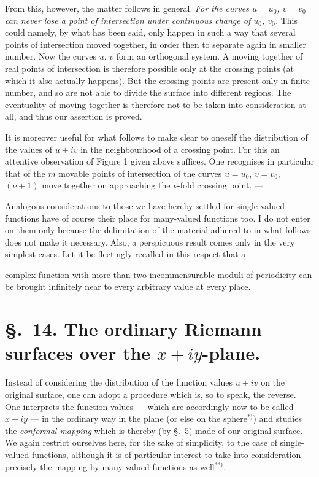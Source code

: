 \documentclass{article}
\begin{document}
From this, however, the matter follows in general. \emph{For the curves $u = u_{0}$, $v = v_{0}$ can never lose a point of intersection under continuous change of $u_{0}$, $v_{0}$.} This could namely, by what has been said, only happen in such a way that several points of intersection moved together, in order then to separate again in smaller number. Now the curves $u$, $v$ form an orthogonal system. A moving together of real points of intersection is therefore possible only at the crossing points (at which it also actually happens). But the crossing points are present only in finite number, and so are not able to divide the surface into different regions. The eventuality of moving together is therefore not to be taken into consideration at all, and thus our assertion is proved.

It is moreover useful for what follows to make clear to oneself the distribution of the values of $u + iv$ in the neighbourhood of a crossing point. For this an attentive observation of Figure 1 given above suffices. One recognises in particular that of the $m$ movable points of intersection of the curves $u = u_{0}$, $v = v_{0}$, $(\nu + 1)$ move together on approaching the $\nu$-fold crossing point. ---

Analogous considerations to those we have hereby settled for single-valued functions have of course their place for many-valued functions too. I do not enter on them only because the delimitation of the material adhered to in what follows does not make it necessary. Also, a perspicuous result comes only in the very simplest cases. Let it be fleetingly recalled in this respect that a

complex function with more than two incommensurable moduli of periodicity can be brought infinitely near to every arbitrary value at every place.

\section*{§.~14. The ordinary Riemann surfaces over the $x + iy$-plane.}

Instead of considering the distribution of the function values $u + iv$ on the original surface, one can adopt a procedure which is, so to speak, the reverse. One interprets the function values --- which are accordingly now to be called $x + iy$ --- in the ordinary way in the plane (or else on the sphere${}^{*)}$) and studies the \emph{conformal mapping} which is thereby (by §.~5) made of our original surface. We again restrict ourselves here, for the sake of simplicity, to the case of single-valued functions, although it is of particular interest to take into consideration precisely the mapping by many-valued functions as well${}^{**)}$.
\end{document}
